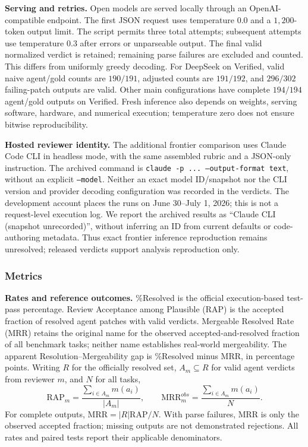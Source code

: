 \documentclass[10pt,conference]{IEEEtran}
\begin{document}
\textbf{Serving and retries.} Open models are served locally through an OpenAI-compatible
endpoint. The first JSON request uses temperature $0.0$ and a $1{,}200$-token output limit.
The script permits three total attempts; subsequent attempts use temperature $0.3$ after
errors or unparseable output. The final valid normalized verdict is retained; remaining
parse failures are excluded and counted. This differs from uniformly greedy decoding.
For DeepSeek on Verified, valid naive agent/gold counts are $190/191$, adjusted counts are
$191/192$, and $296/302$ failing-patch outputs are valid. Other main configurations have
complete $194/194$ agent/gold outputs on Verified. Fresh inference also depends on weights,
serving software, hardware, and numerical execution; temperature zero does not ensure
bitwise reproducibility.

\textbf{Hosted reviewer identity.} The additional frontier comparison uses Claude Code CLI
in headless mode, with the same assembled rubric and a JSON-only instruction. The archived
command is \texttt{claude -p ... --output-format text}, without an explicit
\texttt{--model}. Neither an exact model ID/snapshot nor the CLI version and provider
decoding configuration was recorded in the verdicts. The development account places the
runs on June 30--July 1, 2026; this is not a request-level execution log. We report the
archived results as ``Claude CLI (snapshot unrecorded)'', without inferring an ID from
current defaults or code-authoring metadata. Thus exact frontier inference reproduction
remains unresolved; released verdicts support analysis reproduction only.

\subsubsection{Metrics}

\textbf{Rates and reference outcomes.} \%Resolved is the official execution-based test-pass
percentage. Review Acceptance among Plausible (RAP) is the accepted fraction of resolved
agent patches with valid verdicts. Mergeable Resolved Rate (MRR) retains the original name
for the observed accepted-and-resolved fraction of all benchmark tasks; neither name
establishes real-world mergeability. The apparent Resolution--Mergeability gap is
\%Resolved minus MRR, in percentage points.
Writing $R$ for the officially resolved set, $A_m\subseteq R$ for valid agent verdicts from
reviewer $m$, and $N$ for all tasks,
\[
 \mathrm{RAP}_m=\frac{\sum_{i\in A_m}m(a_i)}{|A_m|},\qquad
 \mathrm{MRR}^{obs}_m=\frac{\sum_{i\in A_m}m(a_i)}{N}.
\]
For complete outputs, $\mathrm{MRR}=|R|\mathrm{RAP}/N$. With parse failures, MRR is only
the observed accepted fraction; missing outputs are not demonstrated rejections. All rates
and paired tests report their applicable denominators.
\end{document}
